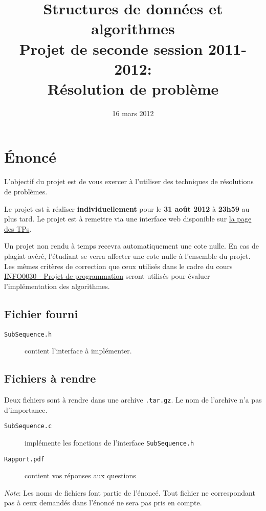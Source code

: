 \documentclass[a4paper,10pt]{article}
\title{
    \textbf{Structures de données et algorithmes}\\
    Projet de seconde session 2011-2012:\\Résolution de problème
}
\date{16 mars 2012}
\begin{document}
\maketitle

\section*{\'Enoncé}

L'objectif du projet est de vous exercer à l'utiliser des techniques de résolutions de problèmes.

Le projet est à réaliser {\bf individuellement} pour le {\bf 31 août
  2012} à {\bf 23h59} au plus tard. Le projet est à remettre via une
interface web disponible sur
\href{http://www.montefiore.ulg.ac.be/~glouppe/2011-2012/students.info0902.php}{la
  page des TPs}.

Un projet non rendu à temps recevra automatiquement une cote nulle. En cas de
plagiat avéré, l'étudiant se verra affecter une cote nulle à l'ensemble du
projet. Les mêmes critères de correction que ceux utilisés dans le cadre du
cours \href{http://www.montefiore.ulg.ac.be/~info0030/}{INFO0030 - Projet de programmation}
seront utilisés pour évaluer l'implémentation des algorithmes.

\subsection*{Fichier fourni}
\begin{description}
\item[\texttt{SubSequence.h}] contient l'interface à implémenter.
\end{description}
\subsection*{Fichiers à rendre}
Deux fichiers sont à rendre dans une archive \texttt{.tar.gz}. Le nom de l'archive n'a pas d'importance.
\begin{description}
\item[\texttt{SubSequence.c}] implémente les fonctions de l'interface \texttt{SubSequence.h}
\item[\texttt{Rapport.pdf}] contient vos réponses aux questions
\end{description}

{\em Note}: Les noms de fichiers font partie de l'énoncé. Tout fichier ne
correspondant pas à ceux demandés dans l'énoncé ne sera pas pris en compte.
\end{document}
